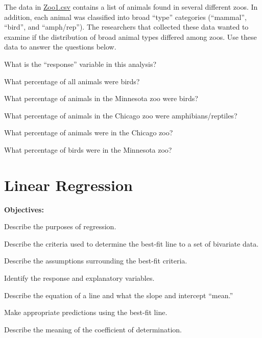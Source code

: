 \documentclass[10pt,openany]{book}\usepackage[]{graphicx}\usepackage[]{color}
\begin{document}
\begin{exsection}
  \item \label{revex:cbEDAZoo1} \rhw{} The data in \href{}{Zoo1.csv} contains a list of animals found in several different zoos.  In addition, each animal was classified into broad ``type'' categories (``mammal'', ``bird'', and ``amph/rep'').  The researchers that collected these data wanted to examine if the distribution of broad animal types differed among zoos.  Use these data to answer the questions below.
  \begin{Enumerate}
    \item What is the ``response'' variable in this analysis?
    \item What percentage of all animals were birds?
    \item What percentage of animals in the Minnesota zoo were birds?
    \item What percentage of animals in the Chicago zoo were amphibians/reptiles?
    \item What percentage of animals were in the Chicago zoo?
    \item What percentage of birds were in the Minnesota zoo?
  \end{Enumerate}
\end{exsection}



\chapter{Linear Regression}  \label{chap:Regress}
\begin{ChapObj}{\boxwidth}
  \textbf{Objectives:}
  \begin{Enumerate}
    \item Describe the purposes of regression.
    \item Describe the criteria used to determine the best-fit line to a set of bivariate data.
    \item Describe the assumptions surrounding the best-fit criteria.
    \item Identify the response and explanatory variables.
    \item Describe the equation of a line and what the slope and intercept ``mean.''
    \item Make appropriate predictions using the best-fit line.
    \item Describe the meaning of the coefficient of determination.
  \end{Enumerate}
\end{ChapObj}
\end{document}
